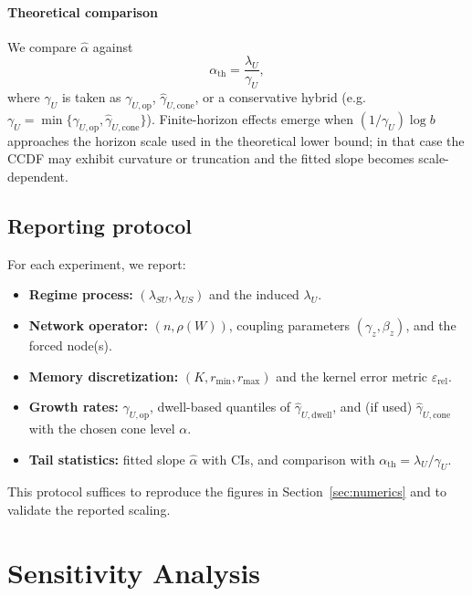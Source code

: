 \documentclass[12pt,a4paper]{article}
\theoremstyle{definition}
\theoremstyle{remark}
\begin{document}
\paragraph{Theoretical comparison}
We compare $\widehat{\alpha}$ against
\begin{equation}\label{eq:tail_index_compare_app}
	\alpha_{\mathrm{th}}=\frac{\lambda_U}{\gamma_U},
\end{equation}
where $\gamma_U$ is taken as $\gamma_{U,\mathrm{op}}$, $\widehat{\gamma}_{U,\mathrm{cone}}$, or a conservative hybrid
(e.g.\ $\gamma_U=\min\{\gamma_{U,\mathrm{op}},\widehat{\gamma}_{U,\mathrm{cone}}\}$).
Finite-horizon effects emerge when $(1/\gamma_U)\log b$ approaches the horizon scale used in the theoretical lower bound; in that case the CCDF
may exhibit curvature or truncation and the fitted slope becomes scale-dependent.

\subsection{Reporting protocol}
\label{app:reporting}

For each experiment, we report:
\begin{itemize}
	\item \textbf{Regime process:} $(\lambda_{SU},\lambda_{US})$ and the induced $\lambda_U$.
	\item \textbf{Network operator:} $(n,\rho(W))$, coupling parameters $(\gamma_z,\beta_z)$, and the forced node(s).
	\item \textbf{Memory discretization:} $(K,r_{\min},r_{\max})$ and the kernel error metric $\varepsilon_{\mathrm{rel}}$.
	\item \textbf{Growth rates:} $\gamma_{U,\mathrm{op}}$, dwell-based quantiles of $\widehat{\gamma}_{U,\mathrm{dwell}}$,
	and (if used) $\widehat{\gamma}_{U,\mathrm{cone}}$ with the chosen cone level $\alpha$.
	\item \textbf{Tail statistics:} fitted slope $\widehat{\alpha}$ with CIs, and comparison with $\alpha_{\mathrm{th}}=\lambda_U/\gamma_U$.
\end{itemize}
This protocol suffices to reproduce the figures in Section~\ref{sec:numerics} and to validate the reported scaling.

\section{Sensitivity Analysis}
\label{app:sensitivity}
\end{document}
